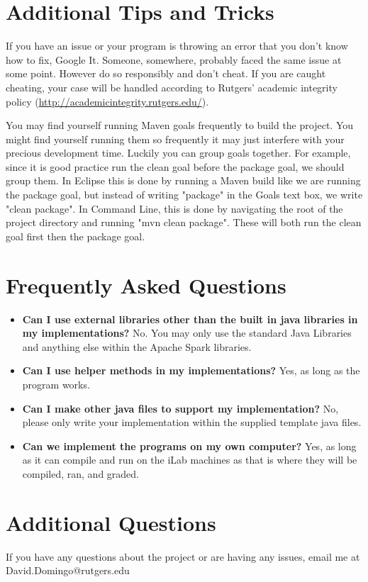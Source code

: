 \documentclass{article}
\begin{document}
\section{Additional Tips and Tricks} %
\begin{info}
If you have an issue or your program is throwing an error that you don't know how to fix, Google It. Someone, somewhere, probably faced the same issue at some point. However do so responsibly and don't cheat. If you are caught cheating, your case will be handled according to Rutgers' academic integrity policy (\href{http://academicintegrity.rutgers.edu/}{http://academicintegrity.rutgers.edu/}).
\end{info}
\begin{info}
You may find yourself running Maven goals frequently to build the project. You might find yourself running them so frequently it may just interfere with your precious development time. Luckily you can group goals together. For example, since it is good practice run the clean goal before the package goal, we should group them. In Eclipse this is done by running a Maven build like we are running the package goal, but instead of writing "package" in the Goals text box, we write "clean package". In Command Line, this is done by navigating the root of the project directory and running "mvn clean package". These will both run the clean goal first then the package goal. 
\end{info}

\section*{Frequently Asked Questions}
\begin{itemize}
\item \textbf{Can I use external libraries other than the built in java libraries in my implementations?} No. You may only use the standard Java Libraries and anything else within the Apache Spark libraries.
\item \textbf{Can I use helper methods in my implementations?} Yes, as long as the program works. 
\item \textbf{Can I make other java files to support my implementation?} No, please only write your implementation within the supplied template java files.
\item \textbf{Can we implement the programs on my own computer?} Yes, as long as it can compile and run on the iLab machines as that is where they will be compiled, ran, and graded. 
\end{itemize}


\section*{Additional Questions} %
If you have any questions about the project or are having any issues, email me at David.Domingo@rutgers.edu
\end{document}

